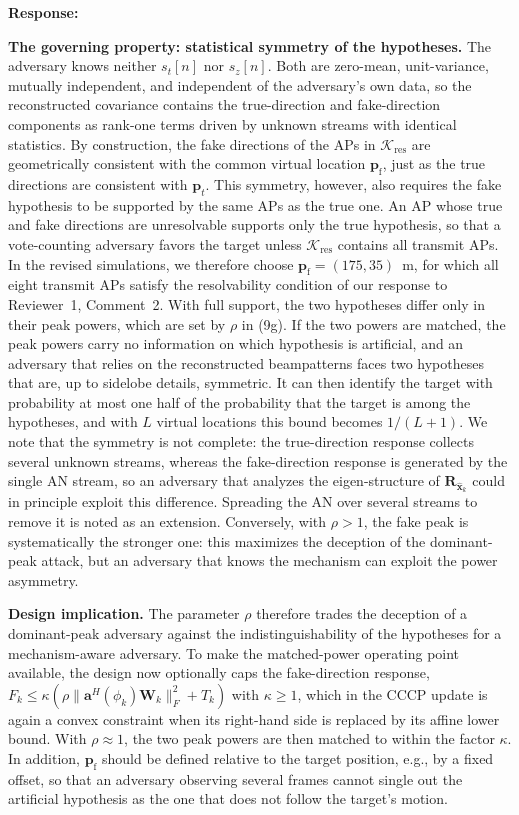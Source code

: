 \documentclass[a4paper,12pt]{article}
\newenvironment{response}{\par\textbf{Response:}\par}{\par}
\begin{document}
\begin{response}
\textbf{The governing property: statistical symmetry of the hypotheses.}
The adversary knows neither $s_t[n]$ nor $s_z[n]$. Both are zero-mean,
unit-variance, mutually independent, and independent of the adversary's own
data, so the reconstructed covariance contains the true-direction and
fake-direction components as rank-one terms driven by unknown streams with
identical statistics. By construction, the fake directions of the APs in
$\mathcal{K}_{\mathrm{res}}$ are geometrically consistent with the common
virtual location $\mathbf{p}_{\mathrm{f}}$, just as the true directions are
consistent with $\mathbf{p}_t$. This symmetry, however, also requires the
fake hypothesis to be supported by the same APs as the true one. An AP whose
true and fake directions are unresolvable supports only the true
hypothesis, so that a vote-counting adversary favors the target unless
$\mathcal{K}_{\mathrm{res}}$ contains all transmit APs. In the revised
simulations, we therefore choose $\mathbf{p}_{\mathrm{f}}=(175,35)$~m, for which
all eight transmit APs satisfy the resolvability condition of our response
to Reviewer~1, Comment~2. With full support, the two hypotheses differ only
in their peak powers, which are set by $\rho$ in (9g). If the two powers are
matched, the peak powers carry no information on which hypothesis is
artificial, and an adversary that relies on the reconstructed beampatterns
faces two hypotheses that are, up to sidelobe details, symmetric. It can
then identify the target with probability at most one half of the
probability that the target is among the hypotheses, and with $L$ virtual
locations this bound becomes $1/(L+1)$. We note that the symmetry is not
complete: the true-direction response collects several unknown streams,
whereas the fake-direction response is generated by the single AN stream,
so an adversary that analyzes the eigen-structure of
$\mathbf{R}_{\widehat{\mathbf{x}}_k}$ could in principle exploit this
difference. Spreading the AN over several streams to remove it is noted as
an extension. Conversely, with $\rho>1$, the fake
peak is systematically the stronger one: this maximizes the deception of the
dominant-peak attack, but an adversary that knows the mechanism can exploit
the power asymmetry.

\textbf{Design implication.} The parameter $\rho$ therefore trades the
deception of a dominant-peak adversary against the indistinguishability of
the hypotheses for a mechanism-aware adversary. To make the matched-power
operating point available, the design now optionally caps the fake-direction
response, $F_k\le\kappa(\rho\|\mathbf{a}^H(\phi_k)\mathbf{W}_k\|_F^2+T_k)$
with $\kappa\ge1$, which in the CCCP update is again a convex constraint
when its right-hand side is replaced by its affine lower bound. With
$\rho\approx1$, the two peak powers are then matched to within the factor
$\kappa$. In addition, $\mathbf{p}_{\mathrm{f}}$ should be defined relative
to the target position, e.g., by a fixed offset, so that an adversary
observing several frames cannot single out the artificial hypothesis as the
one that does not follow the target's motion.


\end{response}
\end{document}
